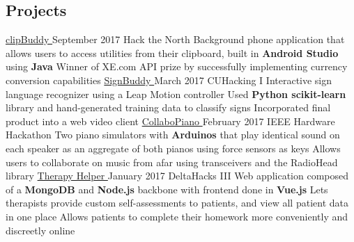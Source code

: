 \documentclass[]{aanguyen_res}
\begin{document}
\begin{main}
		\section{Projects}
			\mainentry%
				{\href{http://github.com/kumailn/clipBuddy}{clipBuddy {\faGithub}}}%
				{September 2017}%
				{Hack the North}%
				{}%
				{\faCaretRight Background phone application that allows users to access utilities from their clipboard, built in \textbf{Android Studio} using \textbf{Java}
				\faCaretRight Winner of XE.com API prize by successfully implementing currency conversion capabilities}
			\vspace{0.1cm}%
			\mainentry%
				{\href{http://github.com/aanguyen/SignBuddy}{SignBuddy {\faGithub}}}%
				{March 2017}%
				{CUHacking I}%
				{}%
				{\faCaretRight Interactive sign language recognizer using a Leap Motion controller 
				\faCaretRight Used \textbf{Python scikit-learn} library and hand-generated training data to classify signs
				\faCaretRight Incorporated final product into a web video client}
			\vspace{0.1cm}%
			\mainentry%
				{\href{http://github.com/aanguyen/CollaboPiano}{CollaboPiano {\faGithub}}}%
				{February 2017}%
				{IEEE Hardware Hackathon}%
				{}%
				{\faCaretRight Two piano simulators with \textbf{Arduinos} that play identical sound on each speaker as an aggregate of both pianos using force sensors as keys
				\faCaretRight Allows users to collaborate on music from afar using transceivers and the RadioHead library}
			\vspace{0.1cm}%
			\mainentry%
				{\href{http://github.com/dtong1113/TherapyHelper}{Therapy Helper {\faGithub}}}%
				{January 2017}%
				{DeltaHacks III}%
				{}%
				{\faCaretRight Web application composed of a \textbf{MongoDB} and \textbf{Node.js} backbone with frontend done in \textbf{Vue.js}
				\faCaretRight Lets therapists provide custom self-assessments to patients, and view all patient data in one place
				\faCaretRight Allows patients to complete their homework more conveniently and discreetly online}

\end{main}
\end{document}

